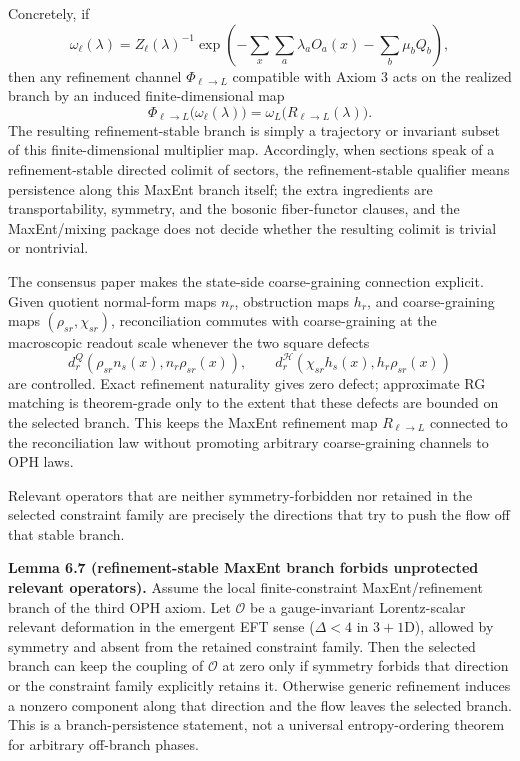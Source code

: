 Concretely, if
\[
\omega_\ell(\lambda)
=
Z_\ell(\lambda)^{-1}
\exp\!\left(
-\sum_x \sum_a \lambda_a O_a(x)-\sum_b \mu_b Q_b
\right),
\]
then any refinement channel \(\Phi_{\ell\to L}\) compatible with Axiom 3 acts on the realized branch by an induced finite-dimensional map
\[
\Phi_{\ell\to L}\bigl(\omega_\ell(\lambda)\bigr)
=
\omega_L\!\bigl(R_{\ell\to L}(\lambda)\bigr).
\]
The resulting refinement-stable branch is simply a trajectory or invariant subset of this finite-dimensional multiplier map. Accordingly, when sections speak of a refinement-stable directed colimit of sectors, the refinement-stable qualifier means persistence along this MaxEnt branch itself; the extra ingredients are transportability, symmetry, and the bosonic fiber-functor clauses, and the MaxEnt/mixing package does not decide whether the resulting colimit is trivial or nontrivial.

The consensus paper makes the state-side coarse-graining connection explicit. Given quotient
normal-form maps \(n_r\), obstruction maps \(h_r\), and coarse-graining maps
\((\rho_{sr},\chi_{sr})\), reconciliation commutes with coarse-graining at the macroscopic readout
scale whenever the two square defects
\[
d^Q_r(\rho_{sr}n_s(x),n_r\rho_{sr}(x)),
\qquad
d^{\mathcal H}_r(\chi_{sr}h_s(x),h_r\rho_{sr}(x))
\]
are controlled. Exact refinement naturality gives zero defect; approximate RG matching is
theorem-grade only to the extent that these defects are bounded on the selected branch. This keeps
the MaxEnt refinement map \(R_{\ell\to L}\) connected to the reconciliation law without promoting
arbitrary coarse-graining channels to OPH laws.

Relevant operators that are neither symmetry-forbidden nor retained in the selected constraint family are precisely the directions that try to push the flow off that stable branch.

\textbf{Lemma 6.7 (refinement-stable MaxEnt branch forbids unprotected relevant operators).} Assume the local finite-constraint MaxEnt/refinement branch of the third OPH axiom. Let \(\mathcal{O}\) be a gauge-invariant Lorentz-scalar relevant deformation in the emergent EFT sense (\(\Delta<4\) in \(3+1\)D), allowed by symmetry and absent from the retained constraint family. Then the selected branch can keep the coupling of \(\mathcal{O}\) at zero only if symmetry forbids that direction or the constraint family explicitly retains it. Otherwise generic refinement induces a nonzero component along that direction and the flow leaves the selected branch. This is a branch-persistence statement, not a universal entropy-ordering theorem for arbitrary off-branch phases.

